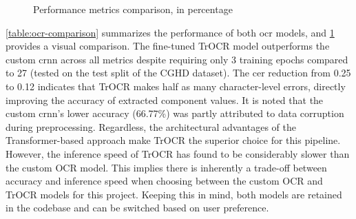 \begin{figure}[ht]
    \centering
    \caption{Performance metrics comparison, in percentage}
    \label{fig:ocr-bar-chart}
\end{figure}

\cref{table:ocr-comparison} summarizes the performance of both \gls{ocr} models, and \cref{fig:ocr-bar-chart} provides a visual comparison. The fine-tuned TrOCR model outperforms the custom \gls{crnn} across all metrics despite requiring only 3 training epochs compared to 27 (tested on the test split of the CGHD dataset). The \gls{cer} reduction from 0.25 to 0.12 indicates that TrOCR makes half as many character-level errors, directly improving the accuracy of extracted component values. It is noted that the custom \gls{crnn}'s lower accuracy (66.77\%) was partly attributed to data corruption during preprocessing. Regardless, the architectural advantages of the Transformer-based approach make TrOCR the superior choice for this pipeline. However, the inference speed of TrOCR has found to be considerably slower than the custom OCR model. This implies there is inherently a trade-off between accuracy and inference speed when choosing between the custom OCR and TrOCR models for this project. Keeping this in mind, both models are retained in the codebase and can be switched based on user preference.

